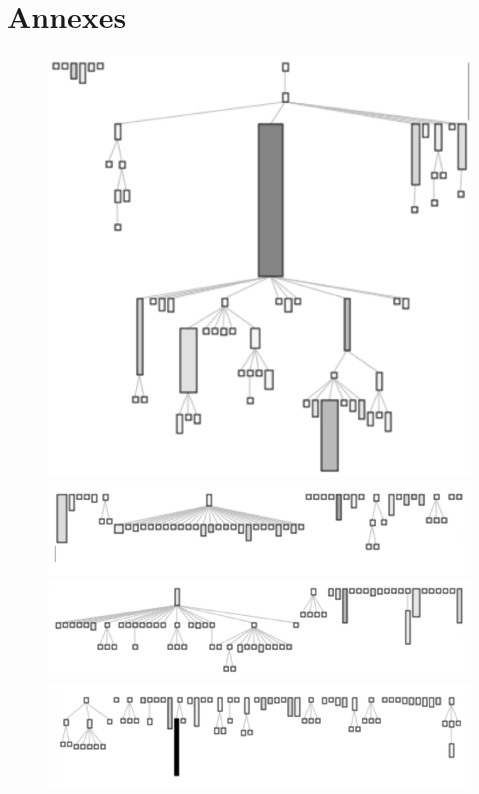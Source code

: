 \documentclass[11pt,a4paper]{article}
\begin{document}
\section{Annexes}
\begin{figure}
\includegraphics[width=\textwidth]{arch_1}
\includegraphics[width=\textwidth]{arch_2}
\includegraphics[width=\textwidth]{arch_3}
\includegraphics[width=\textwidth]{arch_4}

\end{figure}
\end{document}
